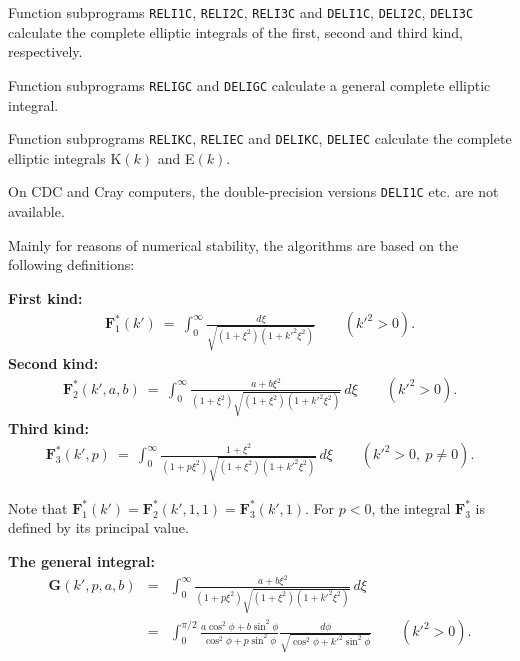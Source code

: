                        
                  
\Submitter{ }                           
                      \Revised{}
Function subprograms {\tt RELI1C}, {\tt RELI2C}, {\tt RELI3C}
and {\tt DELI1C}, {\tt DELI2C}, {\tt DELI3C} calculate
the complete elliptic integrals of the first, second and
third kind, respectively.
\par
Function subprograms {\tt RELIGC} and {\tt DELIGC} calculate a general
complete elliptic integral.
\par
Function subprograms {\tt RELIKC}, {\tt RELIEC} and {\tt DELIKC},
{\tt DELIEC} calculate the complete elliptic integrals K$(k)$ and
E$(k)$.
\par
On CDC and Cray computers, the double-precision versions {\tt DELI1C}
etc. are not available.
\par
Mainly for reasons of numerical stability, the algorithms are based on
the following definitions:
\par
{\bf First kind:}
\begin{eqnarray*}
\mathbf{F}_1^*(k') \ = \  \displaystyle
\int_0^\infty \frac{d\xi}{\sqrt{(1+\xi^2)(1+{k'}^2\xi^2)}}
\qquad ({k'}^2 > 0).
\end{eqnarray*}
{\bf Second kind:}
\begin{eqnarray*}
\mathbf{F}_2^*(k',a,b) \ = \ \displaystyle
\int_0^\infty \frac{a+b\xi^2}{(1+\xi^2)\sqrt{(1+\xi^2)(1+{k'}^2\xi^2)}}
\, d\xi \qquad ({k'}^2 > 0).
\end{eqnarray*}
{\bf Third kind:}
\begin{eqnarray*}
\mathbf{F}_3^*(k',p) \ = \ \displaystyle
\int_0^\infty \frac{1+\xi^2}{(1+p\xi^2)\sqrt{(1+\xi^2)(1+{k'}^2\xi^2)}}
\, d\xi \qquad ({k'}^2 > 0, \ p \ne 0).
\end{eqnarray*}
\par
Note that $\mathbf{F}_1^*(k') = \mathbf{F}_2^*(k',1,1) =
\mathbf{F}_3^*(k',1)$. For $p < 0$, the integral $\mathbf{F}_3^*$ is
defined by its principal value.
\par
{\bf The general integral:}
\begin{eqnarray*}
\mathbf{G}(k',p,a,b) & = & \displaystyle
\int_0^\infty \frac{a+b\xi^2}{(1+p\xi^2)\sqrt{(1+\xi^2)(1+{k'}^2\xi^2)}}
\, d\xi  \\[3mm]
& = & \displaystyle \int_0^{\pi/2} \frac{a \cos^2 \phi + b \sin^2 \phi}
{\cos^2 \phi + p \sin^2 \phi} \frac{d\phi}
{\sqrt{\cos^2 \phi + {k'}^2 \sin^2 \phi}} \qquad ({k'}^2 > 0).
\end{eqnarray*}
